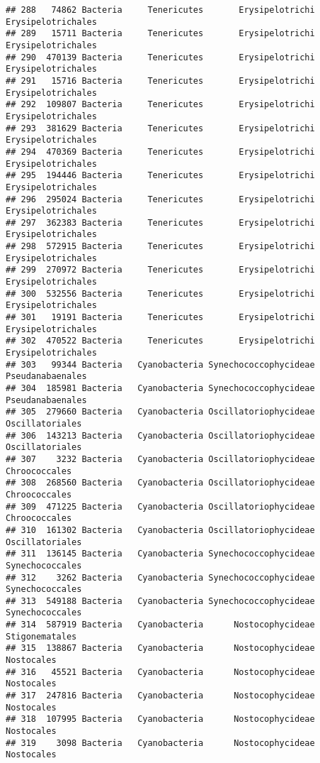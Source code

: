 \documentclass[
]{article}
\begin{document}
\begin{verbatim}
## 288   74862 Bacteria     Tenericutes       Erysipelotrichi  Erysipelotrichales
## 289   15711 Bacteria     Tenericutes       Erysipelotrichi  Erysipelotrichales
## 290  470139 Bacteria     Tenericutes       Erysipelotrichi  Erysipelotrichales
## 291   15716 Bacteria     Tenericutes       Erysipelotrichi  Erysipelotrichales
## 292  109807 Bacteria     Tenericutes       Erysipelotrichi  Erysipelotrichales
## 293  381629 Bacteria     Tenericutes       Erysipelotrichi  Erysipelotrichales
## 294  470369 Bacteria     Tenericutes       Erysipelotrichi  Erysipelotrichales
## 295  194446 Bacteria     Tenericutes       Erysipelotrichi  Erysipelotrichales
## 296  295024 Bacteria     Tenericutes       Erysipelotrichi  Erysipelotrichales
## 297  362383 Bacteria     Tenericutes       Erysipelotrichi  Erysipelotrichales
## 298  572915 Bacteria     Tenericutes       Erysipelotrichi  Erysipelotrichales
## 299  270972 Bacteria     Tenericutes       Erysipelotrichi  Erysipelotrichales
## 300  532556 Bacteria     Tenericutes       Erysipelotrichi  Erysipelotrichales
## 301   19191 Bacteria     Tenericutes       Erysipelotrichi  Erysipelotrichales
## 302  470522 Bacteria     Tenericutes       Erysipelotrichi  Erysipelotrichales
## 303   99344 Bacteria   Cyanobacteria Synechococcophycideae    Pseudanabaenales
## 304  185981 Bacteria   Cyanobacteria Synechococcophycideae    Pseudanabaenales
## 305  279660 Bacteria   Cyanobacteria Oscillatoriophycideae     Oscillatoriales
## 306  143213 Bacteria   Cyanobacteria Oscillatoriophycideae     Oscillatoriales
## 307    3232 Bacteria   Cyanobacteria Oscillatoriophycideae       Chroococcales
## 308  268560 Bacteria   Cyanobacteria Oscillatoriophycideae       Chroococcales
## 309  471225 Bacteria   Cyanobacteria Oscillatoriophycideae       Chroococcales
## 310  161302 Bacteria   Cyanobacteria Oscillatoriophycideae     Oscillatoriales
## 311  136145 Bacteria   Cyanobacteria Synechococcophycideae     Synechococcales
## 312    3262 Bacteria   Cyanobacteria Synechococcophycideae     Synechococcales
## 313  549188 Bacteria   Cyanobacteria Synechococcophycideae     Synechococcales
## 314  587919 Bacteria   Cyanobacteria      Nostocophycideae      Stigonematales
## 315  138867 Bacteria   Cyanobacteria      Nostocophycideae          Nostocales
## 316   45521 Bacteria   Cyanobacteria      Nostocophycideae          Nostocales
## 317  247816 Bacteria   Cyanobacteria      Nostocophycideae          Nostocales
## 318  107995 Bacteria   Cyanobacteria      Nostocophycideae          Nostocales
## 319    3098 Bacteria   Cyanobacteria      Nostocophycideae          Nostocales

\end{verbatim}
\end{document}
